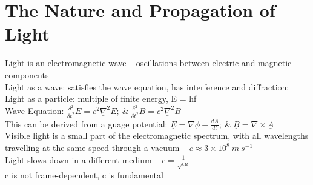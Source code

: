 \documentclass[a4paper, 11pt, fleqn, normalem]{report}
\begin{document}
\section{The Nature and Propagation of Light}
Light is an electromagnetic wave -- oscillations between electric and magnetic components \\
Light as a wave: satisfies the wave equation, has interference and diffraction; \\
Light as a particle: multiple of finite energy, E = hf \\
Wave Equation: $\frac{\delta^{2}}{\delta t^{2}}\underline{E} = c^{2}\underline{\nabla}^{2}\underline{E};~\&~ \frac{\delta^{2}}{\delta t^{2}}B = c^{2}\underline{\nabla}^{2}\underline{B}$ \\
This can be derived from a guage potential: $\underline{E} = \underline{\nabla}\phi + \frac{d\underline{A}}{dt};~\&~\underline{B} = \underline{\nabla}\times\underline{A}$ \\
Visible light is a small part of the electromagnetic spectrum, with all wavelengths travelling at the same speed through a vacuum -- $c \approx 3\times10^{8}\:m\:s^{-1}$ \\
Light slows down in a different medium -- $c = \frac{1}{\sqrt{\epsilon\mu}}$\\
c is not frame-dependent, c is fundamental
\end{document}
